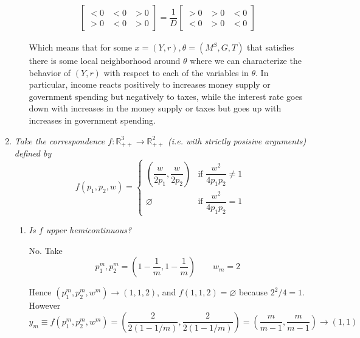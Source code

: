 \documentclass{article}
\begin{document}
\begin{enumerate}[1.]
\begin{enumerate}[a)]
\begin{align*}
          \left[\begin{matrix}
              < 0
            & < 0
            & > 0 \\[6pt]
              > 0
            & < 0
            & > 0
          \end{matrix}\right]
          =
          \dfrac{1}{D}
          \left[\begin{matrix}
              > 0
            & > 0
            & < 0 \\[6pt]
              < 0
            & > 0
            & < 0
          \end{matrix}\right]
        \end{align*}

      Which means that for some $x = (Y, r), \theta = (M^S, G, T)$ that satisfies  there is some local neighborhood around $\theta$ where we can characterize the behavior of $(Y, r)$ with respect to each of the variables in $\theta$. In particular, income reacts positively to increases money supply or government spending but negatively to taxes, while the interest rate goes down with increases in the money supply or taxes but goes up with increases in government spending.
    \end{enumerate}

  \item {\itshape
    Take the correspondence $f: \mathbb{R}^3_{++} \to \mathbb{R}^2_{++}$ (i.e. with strictly posisive arguments) defined by
    \[
      f(p_1, p_2, w)
      =
      \begin{cases}
        \left(\dfrac{w}{2p_1}, \dfrac{w}{2 p_2}\right)
          & \text{if } \dfrac{w^2}{4 p_1 p_2} \ne 1 \\[6pt]
        \varnothing
          & \text{if } \dfrac{w^2}{4 p_1 p_2} = 1
      \end{cases}
    \]}

    \begin{enumerate}
      \item \textit{Is $f$ upper hemicontinuous?}

        \solution No. Take
        \[
          p^m_1, p^m_2
          =
          \left(
            1 - \dfrac{1}{m},
            1 - \dfrac{1}{m}
          \right)
          \quad\quad
          w_m = 2
        \]

        Hence $(p^m_1, p^m_2, w^m) \to (1, 1, 2)$, and $f(1, 1, 2) = \varnothing$ because $2^2 / 4 = 1$. However
        \[
          y_m
          \equiv
          f(p^m_1, p^m_2, w^m)
          =
          \left(\dfrac{2}{2 (1 - 1 / m)}, \dfrac{2}{2 (1 - 1 / m)}\right)
          =
          \left(\dfrac{m}{m - 1}, \dfrac{m}{m - 1}\right)
          \to
          (1, 1)
        \]


\end{enumerate}
\end{enumerate}
\end{document}
